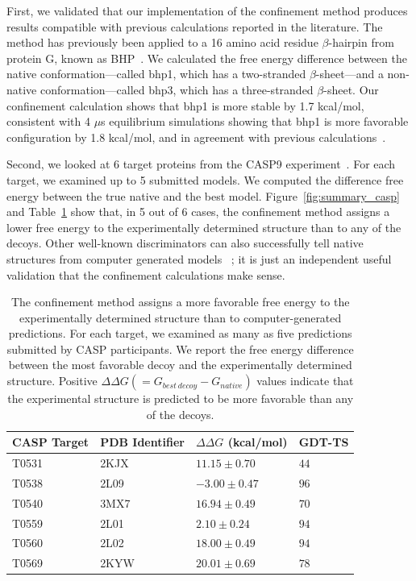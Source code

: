 \documentclass[12pt]{article}
\begin{document}
First, we validated that our implementation of the confinement method produces results compatible with previous
calculations reported in the literature.  The method has previously been applied to a 16 amino acid residue
$\beta$-hairpin from protein G, known as BHP~\cite{Cecchini2009}. We calculated the free energy difference between the
native conformation---called bhp1, which has a two-stranded $\beta$-sheet---and a non-native conformation---called bhp3,
which has a three-stranded $\beta$-sheet. Our confinement calculation shows that bhp1 is more stable by 1.7 kcal/mol,
consistent with 4 $\mu$s equilibrium simulations showing that bhp1 is more favorable configuration by 1.8 kcal/mol, and
in agreement with previous calculations~\cite{Cecchini2009}.

Second, we looked at 6 target proteins from the CASP9 experiment~\cite{Moult2011}.  For each target, we examined up to 5 submitted
models.  We computed the difference free energy between the true native and the best model.
Figure~\ref{fig:summary_casp} and Table~\ref{table:casp_control} show that, in 5 out of 6 cases, the confinement method
assigns a lower free energy to the experimentally determined structure than to any of the decoys.  Other well-known
discriminators can also successfully tell native structures from computer generated models~\cite{Sheffler2009,Zhou2002} 
; it is just an independent useful validation that the confinement calculations make
sense.

\begin{table}
\begin{center}
\caption{The confinement method assigns a more favorable free energy to the experimentally determined structure than to
    computer-generated predictions. For each target, we examined as many as five predictions submitted by CASP
    participants. We report the free energy difference between the most favorable decoy and the experimentally
    determined structure. Positive $\Delta\Delta G (=G_{best~decoy} - G_{native})$ values indicate that the experimental structure is predicted to be
    more favorable than any of the decoys.}
\label{table:casp_control}
\begin{tabular}{l l l l}\hline
    CASP Target  & PDB Identifier & $\Delta \Delta G$ (kcal/mol) & GDT-TS \\ \hline
     T0531       &    2KJX        &          $11.15 \pm 0.70$    &  $44$ \\ \hline
     T0538       &    2L09        &          $-3.00 \pm 0.47$    &  $96$ \\ \hline
     T0540       &    3MX7        &          $16.94 \pm 0.49$    &  $70$ \\ \hline
     T0559       &    2L01        &          $2.10 \pm 0.24$     &  $94$ \\ \hline
     T0560       &    2L02        &          $18.00 \pm 0.49$    &  $94$ \\ \hline
     T0569       &    2KYW        &          $20.01 \pm 0.69$    &  $78$ \\ \hline
\end{tabular}
\end{center}
\end{table}
\end{document}
